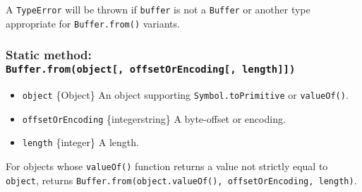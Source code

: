 \begin{Shaded}
\begin{Highlighting}[]
\NormalTok{ \{ }\NormalTok{ \} }\OperatorTok{=} \NormalTok{(}\NormalTok{)}\OperatorTok{;}

\OperatorTok{=} \NormalTok{(}\NormalTok{)}\OperatorTok{;}
\OperatorTok{=} \OperatorTok{;}

\NormalTok{buf1[}\NormalTok{] }\OperatorTok{=} \OperatorTok{;}

\NormalTok{())}\OperatorTok{;}
\NormalTok{())}\OperatorTok{;}
\end{Highlighting}
\end{Shaded}

A \texttt{TypeError} will be thrown if \texttt{buffer} is not a
\texttt{Buffer} or another type appropriate for \texttt{Buffer.from()}
variants.

\subsubsection{\texorpdfstring{Static method:
\texttt{Buffer.from(object{[},\ offsetOrEncoding{[},\ length{]}{]})}}{Static method: Buffer.from(object{[}, offsetOrEncoding{[}, length{]}{]})}}\label{static-method-buffer.fromobject-offsetorencoding-length}

\begin{itemize}
\tightlist
\item
  \texttt{object} \{Object\} An object supporting
  \texttt{Symbol.toPrimitive} or \texttt{valueOf()}.
\item
  \texttt{offsetOrEncoding} \{integer\textbar string\} A byte-offset or
  encoding.
\item
  \texttt{length} \{integer\} A length.
\end{itemize}

For objects whose \texttt{valueOf()} function returns a value not
strictly equal to \texttt{object}, returns
\texttt{Buffer.from(object.valueOf(),\ offsetOrEncoding,\ length)}.

